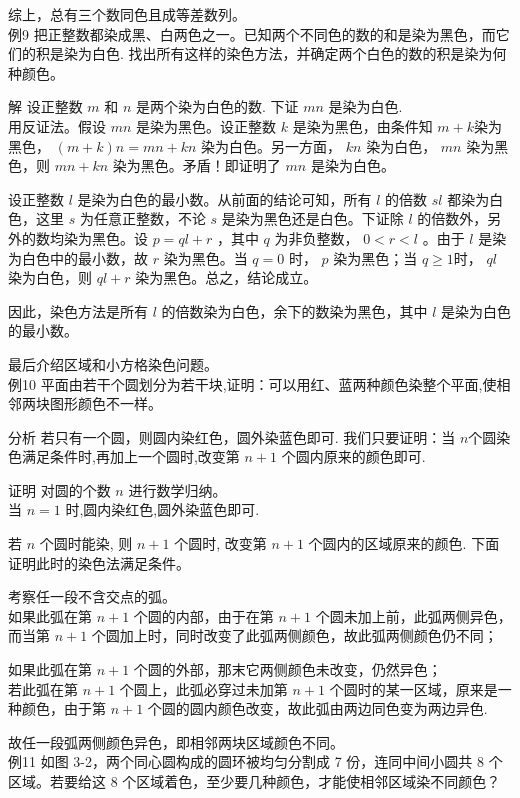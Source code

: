\documentclass[10pt]{article}
\begin{document}
综上，总有三个数同色且成等差数列。\\
例9 把正整数都染成黑、白两色之一。已知两个不同色的数的和是染为黑色，而它们的积是染为白色. 找出所有这样的染色方法，并确定两个白色的数的积是染为何种颜色。

解 设正整数 $m$ 和 $n$ 是两个染为白色的数. 下证 $m n$ 是染为白色.\\
用反证法。假设 $m n$ 是染为黑色。设正整数 $k$ 是染为黑色，由条件知 $m+k$染为黑色， $(m+k) n=m n+k n$ 染为白色。另一方面， $k n$ 染为白色， $m n$ 染为黑色，则 $m n+k n$ 染为黑色。矛盾！即证明了 $m n$ 是染为白色。

设正整数 $l$ 是染为白色的最小数。从前面的结论可知，所有 $l$ 的倍数 $s l$ 都染为白色，这里 $s$ 为任意正整数，不论 $s$ 是染为黑色还是白色。下证除 $l$ 的倍数外，另外的数均染为黑色。设 $p=q l+r$ ，其中 $q$ 为非负整数， $0<r<l$ 。由于 $l$ 是染为白色中的最小数，故 $r$ 染为黑色。当 $q=0$ 时， $p$ 染为黑色；当 $q \geqslant 1$时， $q l$ 染为白色，则 $q l+r$ 染为黑色。总之，结论成立。

因此，染色方法是所有 $l$ 的倍数染为白色，余下的数染为黑色，其中 $l$ 是染为白色的最小数。

最后介绍区域和小方格染色问题。\\
例10 平面由若干个圆划分为若干块,证明：可以用红、蓝两种颜色染整个平面,使相邻两块图形颜色不一样。

分析 若只有一个圆，则圆内染红色，圆外染蓝色即可. 我们只要证明：当 $n$个圆染色满足条件时,再加上一个圆时,改变第 $n+1$ 个圆内原来的颜色即可.

证明 对圆的个数 $n$ 进行数学归纳。\\
当 $n=1$ 时,圆内染红色,圆外染蓝色即可.

若 $n$ 个圆时能染, 则 $n+1$ 个圆时, 改变第 $n+1$ 个圆内的区域原来的颜色. 下面证明此时的染色法满足条件。

考察任一段不含交点的弧。\\
如果此弧在第 $n+1$ 个圆的内部，由于在第 $n+1$ 个圆未加上前，此弧两侧异色，而当第 $n+1$ 个圆加上时，同时改变了此弧两侧颜色，故此弧两侧颜色仍不同；

如果此弧在第 $n+1$ 个圆的外部，那末它两侧颜色未改变，仍然异色；\\
若此弧在第 $n+1$ 个圆上，此弧必穿过未加第 $n+1$ 个圆时的某一区域，原来是一种颜色，由于第 $n+1$ 个圆的圆内颜色改变，故此弧由两边同色变为两边异色.

故任一段弧两侧颜色异色，即相邻两块区域颜色不同。\\
例11 如图 3-2，两个同心圆构成的圆环被均匀分割成 7 份，连同中间小圆共 8 个区域。若要给这 8 个区域着色，至少要几种颜色，才能使相邻区域染不同颜色？
\end{document}
